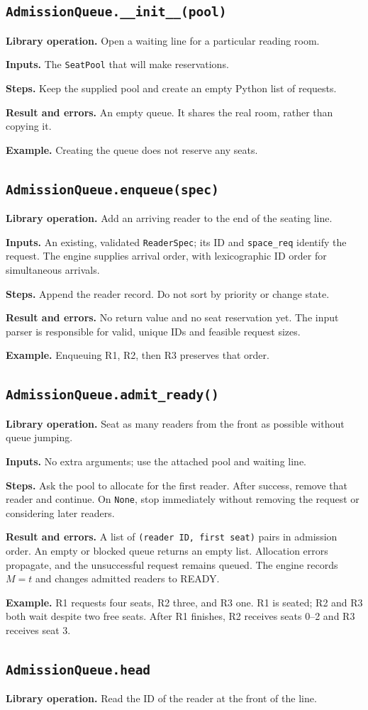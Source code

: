 \documentclass[11pt,a4paper]{article}
\newcommand{\routine}[2]{\subsection{\texorpdfstring{\texttt{#1}}{#2}}}
\newcommand{\librarymeaning}{\textbf{Library operation.} }
\newcommand{\arguments}{\textbf{Inputs.} }
\newcommand{\steps}{\textbf{Steps.} }
\newcommand{\result}{\textbf{Result and errors.} }
\newcommand{\example}{\textbf{Example.} }
\begin{document}
\routine{AdmissionQueue.\_\_init\_\_(pool)}{AdmissionQueue constructor}
\librarymeaning Open a waiting line for a particular reading room.

\arguments The \texttt{SeatPool} that will make reservations.

\steps Keep the supplied pool and create an empty Python list of requests.

\result An empty queue. It shares the real room, rather than copying it.

\example Creating the queue does not reserve any seats.

\routine{AdmissionQueue.enqueue(spec)}{AdmissionQueue enqueue}
\librarymeaning Add an arriving reader to the end of the seating line.

\arguments An existing, validated \texttt{ReaderSpec}; its ID and
\texttt{space\_req} identify the request. The engine supplies arrival order,
with lexicographic ID order for simultaneous arrivals.

\steps Append the reader record. Do not sort by priority or change state.

\result No return value and no seat reservation yet. The input parser is
responsible for valid, unique IDs and feasible request sizes.

\example Enqueuing R1, R2, then R3 preserves that order.

\routine{AdmissionQueue.admit\_ready()}{AdmissionQueue admit ready}
\librarymeaning Seat as many readers from the front as possible without queue jumping.

\arguments No extra arguments; use the attached pool and waiting line.

\steps Ask the pool to allocate for the first reader. After success,
remove that reader and continue. On \texttt{None}, stop immediately without
removing the request or considering later readers.

\result A list of \texttt{(reader ID, first seat)} pairs in admission order.
An empty or blocked queue returns an empty list. Allocation errors propagate,
and the unsuccessful request remains queued. The engine records $M=t$ and
changes admitted readers to READY.

\example R1 requests four seats, R2 three, and R3 one. R1 is seated;
R2 and R3 both wait despite two free seats. After R1 finishes, R2 receives
seats 0--2 and R3 receives seat 3.

\routine{AdmissionQueue.head}{AdmissionQueue head property}
\librarymeaning Read the ID of the reader at the front of the line.
\end{document}
